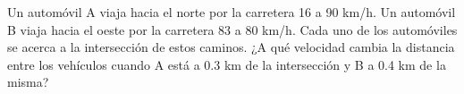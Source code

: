 \item Un automóvil A viaja hacia el norte por la carretera 16 a 90 km/h. Un automóvil B viaja hacia el oeste por la carretera 83 a 80 km/h. Cada uno de los automóviles se acerca a la intersección de estos caminos. ¿A qué velocidad cambia la distancia entre los vehículos cuando A está a 0.3 km de la intersección y B a 0.4 km de la misma?
